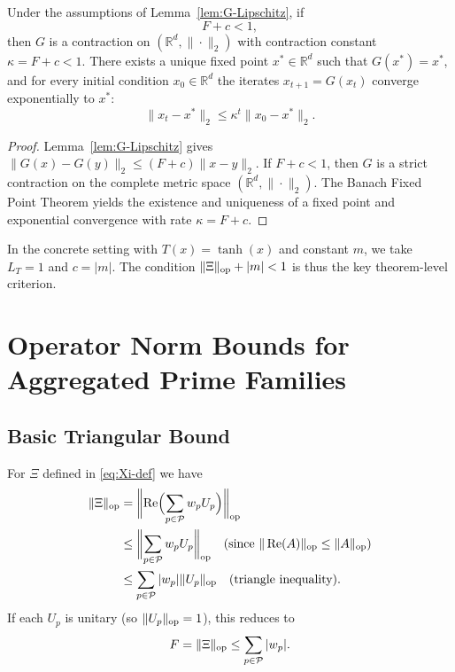\documentclass[11pt,letterpaper]{article}
\begin{document}
\begin{theorem}
\label{thm:contraction}
Under the assumptions of Lemma~\ref{lem:G-Lipschitz}, if
\[
  F + c < 1,
\]
then \(G\) is a contraction on \((\mathbb{R}^d,\|\cdot\|_2)\) with
contraction constant \(\kappa = F + c < 1\). There exists a unique fixed point
\(x^*\in\mathbb{R}^d\) such that \(G(x^*) = x^*\), and for every
initial condition \(x_0\in\mathbb{R}^d\) the iterates \(x_{t+1}=G(x_t)\)
converge exponentially to \(x^*\):
\[
  \|x_t - x^*\|_2 \le \kappa^t \|x_0 - x^*\|_2.
\]
\end{theorem}

\begin{proof}
Lemma~\ref{lem:G-Lipschitz} gives \(\|G(x)-G(y)\|_2 \le (F+c)\|x-y\|_2\).
If \(F + c < 1\), then \(G\) is a strict contraction on the complete
metric space \((\mathbb{R}^d,\|\cdot\|_2)\). The Banach Fixed Point
Theorem yields the existence and uniqueness of a fixed point and exponential
convergence with rate \(\kappa = F + c\).
\end{proof}

In the concrete setting with \(T(x) = \tanh(x)\) and constant \(m\), we take
\(L_T = 1\) and \(c = |m|\). The condition \(\|\Xi\|_{\rm op} + |m| < 1\)
is thus the key theorem-level criterion.

\section{Operator Norm Bounds for Aggregated Prime Families}

\subsection{Basic Triangular Bound}

For \(\Xi\) defined in \eqref{eq:Xi-def} we have
\begin{align}
  \|\Xi\|_{\rm op}
  &= \biggl\|\operatorname{Re}\Bigl(\sum_{p\in\mathcal{P}} w_p U_p\Bigr)\biggr\|_{\rm op} \\
  &\le \biggl\|\sum_{p\in\mathcal{P}} w_p U_p\biggr\|_{\rm op}
     \quad\text{(since \(\|\operatorname{Re}(A)\|_{\rm op} \le \|A\|_{\rm op}\))} \\
  &\le \sum_{p\in\mathcal{P}} |w_p| \|U_p\|_{\rm op}
     \quad\text{(triangle inequality)}.
\end{align}
If each \(U_p\) is unitary (so \(\|U_p\|_{\rm op}=1\)), this reduces to
\begin{equation}
  F = \|\Xi\|_{\rm op} \le \sum_{p\in\mathcal{P}} |w_p|.
  \label{eq:F-upper}
\end{equation}
\end{document}
